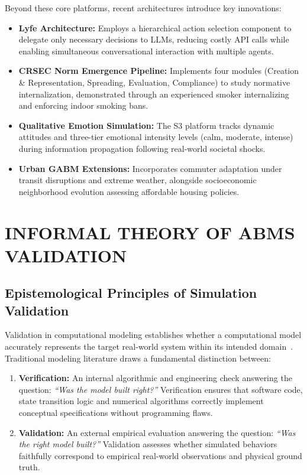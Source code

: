 \documentclass[12pt,a4paper]{report}
\begin{document}
Beyond these core platforms, recent architectures introduce key innovations:
\begin{itemize}
    \item \textbf{Lyfe Architecture:} Employs a hierarchical action selection component to delegate only necessary decisions to LLMs, reducing costly API calls while enabling simultaneous conversational interaction with multiple agents.
    \item \textbf{CRSEC Norm Emergence Pipeline:} Implements four modules (Creation \& Representation, Spreading, Evaluation, Compliance) to study normative internalization, demonstrated through an experienced smoker internalizing and enforcing indoor smoking bans.
    \item \textbf{Qualitative Emotion Simulation:} The S3 platform tracks dynamic attitudes and three-tier emotional intensity levels (calm, moderate, intense) during information propagation following real-world societal shocks.
    \item \textbf{Urban GABM Extensions:} Incorporates commuter adaptation under transit disruptions and extreme weather, alongside socioeconomic neighborhood evolution assessing affordable housing policies.
\end{itemize}

\chapter{INFORMAL THEORY OF ABMS VALIDATION}
\label{chap:abm_validation}

\section{Epistemological Principles of Simulation Validation}
\label{sec:validation_principles}

Validation in computational modeling establishes whether a computational model accurately represents the target real-world system within its intended domain~\cite{grimm2006standard}. Traditional modeling literature draws a fundamental distinction between:
\begin{enumerate}[label=\arabic*.]
    \item \textbf{Verification:} An internal algorithmic and engineering check answering the question: \textit{``Was the model built right?''} Verification ensures that software code, state transition logic and numerical algorithms correctly implement conceptual specifications without programming flaws.
    \item \textbf{Validation:} An external empirical evaluation answering the question: \textit{``Was the right model built?''} Validation assesses whether simulated behaviors faithfully correspond to empirical real-world observations and physical ground truth.
\end{enumerate}
\end{document}

